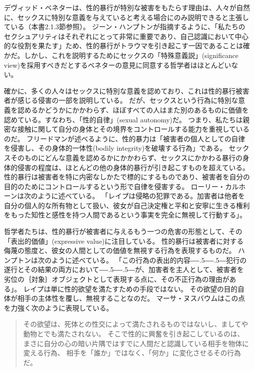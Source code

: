 \documentclass[paper=a4,book,openany]{jlreq}
\newcommand{\ig}[1]{}           %
\def\DDASH{―\kern-.5\zw―\kern-.5\zw―} %
\begin{document}
デヴィッド・ベネター\ig{David Benatar}は、性的暴行が特別な被害をもたらす理由は、人々が自然に、セックスに特別な意義を与えていると考える場合にのみ説明できると主張している（本書2.1.3節参照）。
ジーン・ハンプトン\ig{Jean Hampton}が指摘するように、「私たちのセクシュアリティはそれぞれにとって非常に重要であり、自己認識において中心的な役割を果たす」ため、性的暴行がトラウマを引き起こす一因であることは確かだ\citep[p.151]{hampton99:_defin_wrong_and_defin_rape}。しかし、これを説明するためにセックスの「特殊意義説」(significance view)を採用すべきだとするベネター\ig{Benatar}の意見に同意する哲学者はほとんどいない。

確かに、多くの人々はセックスに特別な意義を認めており、これは性的暴行被害者が感じる侵害の一部を説明している。
だが、セックスという行為に特別な意義を認めるかどうかにかかわらず、ほぼすべての人はまた別のあるものに価値を認めている。すなわち、「性的自律」(sexual autonomy)だ。
つまり、私たちは親密な接触に関して自分の身体とその境界をコントロールする能力を重視しているのだ。
フリードマン\ig{Karyn L. Freedman}が述べるように、性的暴力は「被害者の個人としての自律を侵害し、その身体的一体性(bodily integrity)を破壊する行為」である。
セックスそのものにどんな意義を認めるかにかかわらず、セックスにかかわる暴行の身体的侵害の程度は、ほとんどの他の身体的暴行が引き起こすものを超えている。
性的暴行は被害者を特に内密なしかたで標的にするものであり、被害者を自分の目的のためにコントロールするという形で自律を侵害する。
ローリー・カルホーン\ig{Laurie Calhoun}は次のように述べている。
「レイプは侵略の犯罪である。加害者は他者を自分の個人的な所有物として扱い、彼女が自己決定権と平和と安寧に生きる権利をもった知性と感性を持つ人間であるという事実を完全に無視して行動する」\citep[p.109]{calhoun97:_rape}。

哲学者たちは、性的暴行が被害者に与えるもう一つの危害の形態として、その「表出的価値」(expressive value)に注目している。
性的暴行は被害者に対する侮蔑の態度と、彼女の人間としての価値を無視する行為を表現するものだ。
ハンプトンは次のように述べている。
「この行為の表出的内容{\DDASH}犯行の遂行とその結果の両方において{\DDASH}が、加害者を主人として、被害者を劣位の｛対象｝{オブジェクト}として表現する点に、その不正行為の理由がある」\citep[p.135]{hampton99:_defin_wrong_and_defin_rape}。
レイプは単に性的欲望を満たすための手段ではない。
その欲望の目的自体が相手の主体性を覆し、無視することなのだ。
マーサ・ヌスバウムはこの点を力強く次のように表現している。

\begin{quote}
その欲望は、死体との性交によって満たされるものではないし、ましてや動物とでも満たされない。
そこで性的に興奮を引き起こしているのは、まさに自分の心の暗い片隅ではすでに人間だと認識している相手を物体に変える行為、
相手を「誰か」ではなく、「何か」に変化させるその行為だ。
\citep[p.281]{nussbaum95:_objec}
\end{quote}
\end{document}

